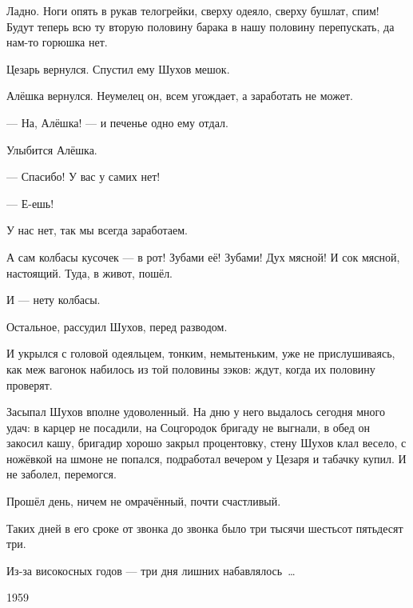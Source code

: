 Ладно. Ноги опять в рукав телогрейки, сверху одеяло, сверху бушлат, спим! Будут теперь всю ту 
вторую половину барака в нашу половину перепускать, да нам-то горюшка нет.

Цезарь вернулся. Спустил ему Шухов мешок.

Алёшка вернулся. Неумелец он, всем угождает, а заработать не может.

--- На, Алёшка! --- и печенье одно ему отдал.

Улыбится Алёшка.

--- Спасибо! У вас у самих нет!

--- Е-ешь!

У нас нет, так мы всегда заработаем.

А сам колбасы кусочек --- в рот! Зубами её! Зубами! Дух мясной! И сок мясной, настоящий. Туда, в 
живот, пошёл.

И --- нету колбасы.

Остальное, рассудил Шухов, перед разводом.

И укрылся с головой одеяльцем, тонким, немытеньким, уже не прислушиваясь, как меж вагонок 
набилось из той половины зэков: ждут, когда их половину проверят.


Засыпал Шухов вполне удоволенный. На дню у него выдалось сегодня много удач: в карцер не 
посадили, на Соцгородок бригаду не выгнали, в обед он закосил кашу, бригадир хорошо закрыл 
процентовку, стену Шухов клал весело, с ножёвкой на шмоне не попался, подработал вечером у 
Цезаря и табачку купил. И не заболел, перемогся.

Прошёл день, ничем не омрачённый, почти счастливый.


Таких дней в его сроке от звонка до звонка было три тысячи шестьсот пятьдесят три.

Из-за високосных годов --- три дня лишних набавлялось~\dots{}


1959
\bye
